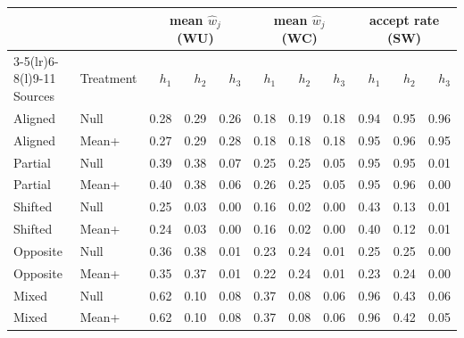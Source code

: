 \begin{tabular}{@{}llrrrrrrrrr@{}}
\toprule
 & & \multicolumn{3}{c}{mean $\hat w_j$ (WU)} & \multicolumn{3}{c}{mean $\hat w_j$ (WC)} & \multicolumn{3}{c}{accept rate (SW)}\\
\cmidrule(lr){3-5}\cmidrule(lr){6-8}\cmidrule(l){9-11}
Sources & Treatment & $h_1$ & $h_2$ & $h_3$ & $h_1$ & $h_2$ & $h_3$ & $h_1$ & $h_2$ & $h_3$\\
\midrule
Aligned & Null & 0.28 & 0.29 & 0.26 & 0.18 & 0.19 & 0.18 & 0.94 & 0.95 & 0.96\\
Aligned & Mean+ & 0.27 & 0.29 & 0.28 & 0.18 & 0.18 & 0.18 & 0.95 & 0.96 & 0.95\\
Partial & Null & 0.39 & 0.38 & 0.07 & 0.25 & 0.25 & 0.05 & 0.95 & 0.95 & 0.01\\
Partial & Mean+ & 0.40 & 0.38 & 0.06 & 0.26 & 0.25 & 0.05 & 0.95 & 0.96 & 0.00\\
Shifted & Null & 0.25 & 0.03 & 0.00 & 0.16 & 0.02 & 0.00 & 0.43 & 0.13 & 0.01\\
Shifted & Mean+ & 0.24 & 0.03 & 0.00 & 0.16 & 0.02 & 0.00 & 0.40 & 0.12 & 0.01\\
Opposite & Null & 0.36 & 0.38 & 0.01 & 0.23 & 0.24 & 0.01 & 0.25 & 0.25 & 0.00\\
Opposite & Mean+ & 0.35 & 0.37 & 0.01 & 0.22 & 0.24 & 0.01 & 0.23 & 0.24 & 0.00\\
Mixed & Null & 0.62 & 0.10 & 0.08 & 0.37 & 0.08 & 0.06 & 0.96 & 0.43 & 0.06\\
Mixed & Mean+ & 0.62 & 0.10 & 0.08 & 0.37 & 0.08 & 0.06 & 0.96 & 0.42 & 0.05\\
\bottomrule
\end{tabular}